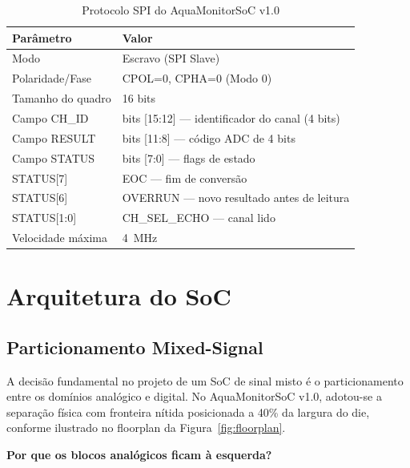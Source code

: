 \documentclass[12pt,a4paper]{article}
\begin{document}
\begin{table}[H]
  \centering
  \caption{Protocolo SPI do AquaMonitorSoC v1.0}
  \label{tab:spi_spec}
  \begin{tabular}{ll}
    \toprule
    \textbf{Parâmetro} & \textbf{Valor} \\
    \midrule
    Modo              & Escravo (SPI Slave) \\
    Polaridade/Fase   & CPOL=0, CPHA=0 (Modo 0) \\
    Tamanho do quadro & 16 bits \\
    Campo CH\_ID      & bits [15:12] — identificador do canal (4 bits) \\
    Campo RESULT      & bits [11:8]  — código ADC de 4 bits \\
    Campo STATUS      & bits [7:0]   — flags de estado \\
    STATUS[7]         & EOC — fim de conversão \\
    STATUS[6]         & OVERRUN — novo resultado antes de leitura \\
    STATUS[1:0]       & CH\_SEL\_ECHO — canal lido \\
    Velocidade máxima & \SI{4}{\mega\hertz} \\
    \bottomrule
  \end{tabular}
\end{table}

\newpage

\section{Arquitetura do SoC}
\label{sec:arquitetura}

\subsection{Particionamento Mixed-Signal}

A decisão fundamental no projeto de um SoC de sinal misto é o particionamento
entre os domínios analógico e digital. No AquaMonitorSoC v1.0, adotou-se a
separação física com fronteira nítida posicionada a 40\% da largura do die,
conforme ilustrado no floorplan da Figura~\ref{fig:floorplan}.

\textbf{Por que os blocos analógicos ficam à esquerda?}
\end{document}
